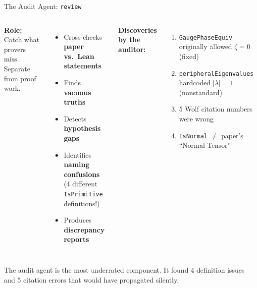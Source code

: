 \documentclass[aspectratio=169,10pt]{beamer}
\begin{document}
\begin{frame}{The Audit Agent: \texttt{review}}
    \begin{columns}[T]
        \textcolor{softred}{\textbf{Role:}} Catch what provers miss. Separate from proof work.
        \vspace{0.3em}
        \begin{itemize}
            \item Cross-checks \textbf{paper vs.\ Lean statements}
            \item Finds \textbf{vacuous truths}
            \item Detects \textbf{hypothesis gaps}
            \item Identifies \textbf{naming confusions} {\scriptsize(4 different \texttt{IsPrimitive} definitions!)}
            \item Produces \textbf{discrepancy reports}
        \end{itemize}
        \textbf{Discoveries by the auditor:}
        \begin{enumerate}
            \item \texttt{GaugePhaseEquiv} originally allowed $\zeta = 0$ {\scriptsize(fixed)}
            \item \texttt{peripheralEigenvalues} hardcoded $|\lambda|=1$ {\scriptsize(nonstandard)}
            \item 5 Wolf citation numbers were wrong
            \item \texttt{IsNormal} $\neq$ paper's ``Normal Tensor''
        \end{enumerate}
    \end{columns}
    \vspace{0.3em}
    \textcolor{dimwhite}{\footnotesize The audit agent is the most underrated component. It found 4 definition issues and 5 citation errors that would have propagated silently.}
\end{frame}
\end{document}
